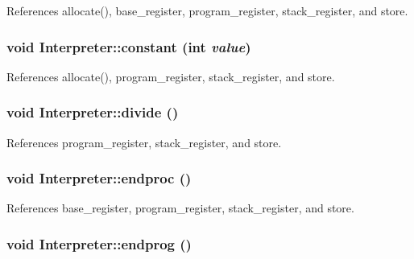 References allocate(), base\_\-register, program\_\-register, stack\_\-register, and store.

\hypertarget{classInterpreter_a88892bf93230336ef0ea0c2a218e5af6}{
\subsubsection[{constant}]{\setlength{\rightskip}{0pt plus 5cm}void Interpreter::constant (int {\em value})}}
\label{classInterpreter_a88892bf93230336ef0ea0c2a218e5af6}


References allocate(), program\_\-register, stack\_\-register, and store.

\hypertarget{classInterpreter_a08c1dbed7667664b45c26142cc90b9c7}{
\subsubsection[{divide}]{\setlength{\rightskip}{0pt plus 5cm}void Interpreter::divide ()}}
\label{classInterpreter_a08c1dbed7667664b45c26142cc90b9c7}


References program\_\-register, stack\_\-register, and store.

\hypertarget{classInterpreter_aea3951f5783795c265a9c032c67cd246}{
\subsubsection[{endproc}]{\setlength{\rightskip}{0pt plus 5cm}void Interpreter::endproc ()}}
\label{classInterpreter_aea3951f5783795c265a9c032c67cd246}


References base\_\-register, program\_\-register, stack\_\-register, and store.

\hypertarget{classInterpreter_ad8087c5f94eafe127280d03351906424}{
\subsubsection[{endprog}]{\setlength{\rightskip}{0pt plus 5cm}void Interpreter::endprog ()}}
\label{classInterpreter_ad8087c5f94eafe127280d03351906424}


